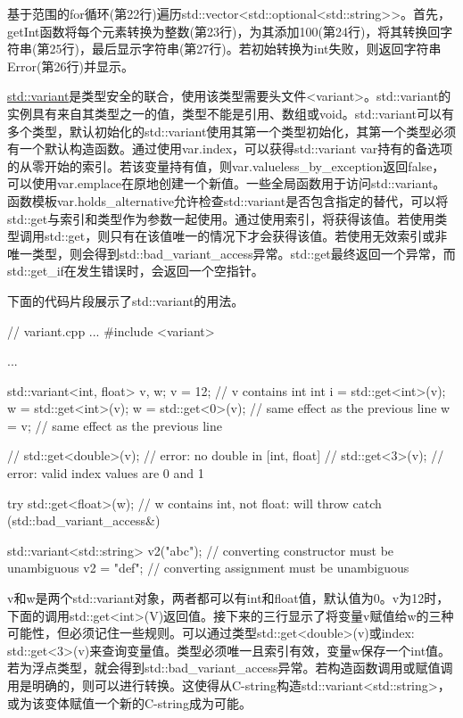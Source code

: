 基于范围的for循环(第22行)遍历std::vector<std::optional<std::string>{}>。首先，getInt函数将每个元素转换为整数(第23行)，为其添加100(第24行)，将其转换回字符串(第25行)，最后显示字符串(第27行)。若初始转换为int失败，则返回字符串Error(第26行)并显示。


\href{http://en.cppreference.com/w/cpp/utility/variant}{std::variant}是类型安全的联合，使用该类型需要头文件<variant>。std::variant的实例具有来自其类型之一的值，类型不能是引用、数组或void。std::variant可以有多个类型，默认初始化的std::variant使用其第一个类型初始化，其第一个类型必须有一个默认构造函数。通过使用var.index，可以获得std::variant var持有的备选项的从零开始的索引。若该变量持有值，则var.valueless\_by\_exception返回false，可以使用var.emplace在原地创建一个新值。一些全局函数用于访问std::variant。函数模板var.holds\_alternative允许检查std::variant是否包含指定的替代，可以将std::get与索引和类型作为参数一起使用。通过使用索引，将获得该值。若使用类型调用std::get，则只有在该值唯一的情况下才会获得该值。若使用无效索引或非唯一类型，则会得到std::bad\_variant\_access异常。std::get最终返回一个异常，而std::get\_if在发生错误时，会返回一个空指针。

下面的代码片段展示了std::variant的用法。


\begin{cpp}
// variant.cpp
...
#include <variant>

...

std::variant<int, float> v, w;
v = 12; // v contains int
int i = std::get<int>(v);
w = std::get<int>(v);
w = std::get<0>(v); // same effect as the previous line
w = v; // same effect as the previous line

// std::get<double>(v); // error: no double in [int, float]
// std::get<3>(v); // error: valid index values are 0 and 1

try{
	std::get<float>(w); // w contains int, not float: will throw
}
catch (std::bad_variant_access&) {}

std::variant<std::string> v2("abc"); // converting constructor must be unambiguous
v2 = "def"; // converting assignment must be unambiguous
\end{cpp}

v和w是两个std::variant对象，两者都可以有int和float值，默认值为0。v为12时，下面的调用std::get<int>(V)返回值。接下来的三行显示了将变量v赋值给w的三种可能性，但必须记住一些规则。可以通过类型std::get<double>(v)或index: std::get<3>(v)来查询变量值。类型必须唯一且索引有效，变量w保存一个int值。若为浮点类型，就会得到std::bad\_variant\_access异常。若构造函数调用或赋值调用是明确的，则可以进行转换。这使得从C-string构造std::variant<std::string>，或为该变体赋值一个新的C-string成为可能。


